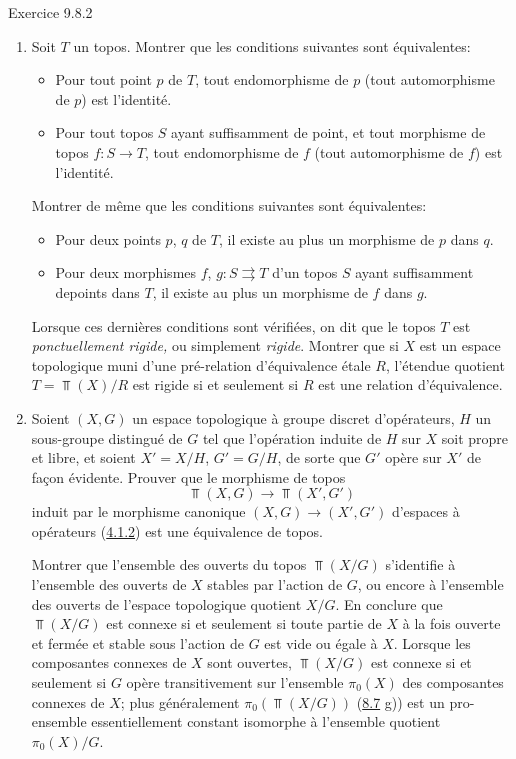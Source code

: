 \begin{enonce*}[remark]{Exercice 9.8.2}
\begin{enumerate}
\item Soit $T$ un topos. Montrer que les conditions suivantes sont
équivalentes:
\begin{itemize}
\item[i)] Pour tout point $p$ de $T$, tout endomorphisme de $p$
(\resp tout automorphisme de $p$) est l'identité.

\item[ii)] Pour tout topos $S$ ayant suffisamment de point, et tout
morphisme de topos $f:S\rightarrow T$, tout endomorphisme de $f$
(\resp tout automorphisme de $f$) est l'identité.
\end{itemize}
Montrer de même que les conditions suivantes sont équivalentes:
\begin{itemize}
\item[${\rm i')}$] Pour deux points $p$, $q$ de $T$, il existe au
plus un morphisme de $p$ dans $q$.

\item[${\rm ii')}$] Pour deux morphismes $f$, $g:S\rightrightarrows
T$ d'un topos $S$ ayant suffisamment de\pageoriginale points dans
$T$, il existe au plus un morphisme de $f$ dans $g$.
\end{itemize}

Lorsque ces dernières conditions sont vérifiées, on dit que le topos
$T$ est \emph{ponctuellement rigide,} ou simplement \emph{rigide}.
Montrer que si $X$ est un espace topologique muni d'une pré-relation
d'équivalence étale $R$, l'étendue quotient $T=\Top(X)/R$ est rigide
si et seulement si $R$ est une relation d'équivalence.

\item Soient $(X,G)$ un espace topologique à groupe discret d'opérateurs,
$H$ un sous-groupe distingué de $G$ tel que l'opération induite de
$H$ sur $X$ soit propre et libre, et soient $X'=X/H$, $G'=G/H$, de
sorte que $G'$ opère sur $X'$ de façon évidente. Prouver que le
morphisme de topos
$$
\Top(X,G)\longrightarrow \Top(X',G')
$$
induit par le morphisme canonique $(X,G)\rightarrow (X',G')$
d'espaces à opérateurs (\hyperref[IV.subsubsec4.1.2]{4.1.2}) est une équivalence
de topos.

Montrer que l'ensemble des ouverts du topos $\Top(X/G)$ s'identifie
à l'ensemble des ouverts de $X$ stables par l'action de $G$, ou
encore à l'ensemble des ouverts de l'espace topologique quotient
$X/G$. En conclure que $\Top(X/G)$ est connexe si et seulement si
toute partie de $X$ à la fois ouverte et fermée et stable sous
l'action de $G$ est vide ou égale à $X$. Lorsque les composantes
connexes de $X$ sont ouvertes, $\Top(X/G)$ est connexe si et
seulement si $G$ opère transitivement sur l'ensemble $\pi_0(X)$ des
composantes connexes de $X$; plus généralement $\pi_0(\Top(X/G))$
(\hyperref[IV.exer8.7]{8.7} g)) est un pro-ensemble essentiellement constant
isomorphe à l'ensemble quotient $\pi_0(X)/G$.


\end{enumerate}
\end{enonce*}
